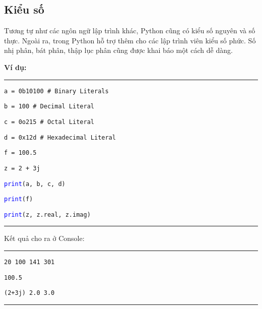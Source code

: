 \subsection{Kiểu số}
Tương tự như các ngôn ngữ lập trình khác, Python cũng có kiểu số nguyên và số thực. Ngoài ra, trong Python hỗ trợ thêm cho các lập trình viên kiểu số phức. Số nhị phân, bát phân, thập lục phân cũng được khai báo một cách dễ dàng.\par
\textbf{Ví dụ:}\\
\rule{\linewidth}{0.2mm}\par
\begin{linenumbers}
	\texttt{a = 0b10100  \# Binary Literals}\par
	\texttt{b = 100  \# Decimal Literal}\par
	\texttt{c = 0o215  \# Octal Literal}\par
	\texttt{d = 0x12d  \# Hexadecimal Literal}\par
	\texttt{f = 100.5}\par
	\texttt{z = 2 + 3j}\par
	\texttt{\textcolor{blue}{print}(a, b, c, d)}\par
	\texttt{\textcolor{blue}{print}(f)}\par
	\texttt{\textcolor{blue}{print}(z, z.real, z.imag)}\par
\end{linenumbers}
\rule{\linewidth}{0.2mm}\par
\noindent
\resetlinenumber
Kết quả cho ra ở Console:\\
\rule{\linewidth}{0.2mm}\par
\begin{linenumbers}
	\texttt{20 100 141 301}\par
	\texttt{100.5}\par
	\texttt{(2+3j) 2.0 3.0}\par
\end{linenumbers}
\rule{\linewidth}{0.2mm}\par
\resetlinenumber
\newpage
